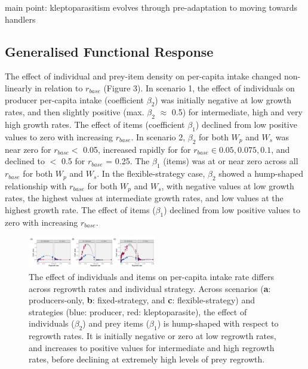 \documentclass[11pt]{article}
\begin{document}
main point: kleptoparasitism evolves through pre-adaptation to moving towards handlers

\subsection*{Generalised Functional Response}

The effect of individual and prey-item density on per-capita intake changed non-linearly in relation to $r_{base}$ (Figure 3).
In scenario 1, the effect of individuals on producer per-capita intake (coefficient $\beta_2$) was initially negative at low growth rates, and then slightly positive (max. $\beta_2$ $\approx$ 0.5) for intermediate, high and very high growth rates.
The effect of items (coefficient $\beta_1$) declined from low positive values to zero with increasing $r_{base}$.
In scenario 2, $\beta_2$ for both $W_p$ and $W_s$ was near zero for $r_{base} <$ 0.05, increased rapidly for for $r_{base} \in 0.05, 0.075, 0.1$, and declined to $<$ 0.5 for $r_{base}$ = 0.25.
The $\beta_1$ (items) was at or near zero across all $r_{base}$ for both $W_p$ and $W_s$.
In the flexible-strategy case, $\beta_2$ showed a hump-shaped relationship with $r_{base}$ for both $W_p$ and $W_s$, with negative values at low growth rates, the highest values at intermediate growth rates, and low values at the highest growth rate.
The effect of items ($\beta_1$) declined from low positive values to zero with increasing $r_{base}$.

\begin{figure}[h]
    \centering
    \includegraphics[width=0.50\textwidth]{figures/fig_05_coef_intake_general.png}
    \caption{
        The effect of individuals and items on per-capita intake rate differs across regrowth rates and individual strategy.
        Across scenarios (\textbf{a}: producers-only, \textbf{b}: fixed-strategy, and \textbf{c}: flexible-strategy) and strategies (blue: producer, red: kleptoparasite), the effect of individuals ($\beta_2$) and prey items ($\beta_1$) is hump-shaped with respect to regrowth rates.
        It is initially negative or zero at low regrowth rates, and increases to positive values for intermediate and high regrowth rates, before declining at extremely high levels of prey regrowth.
    }
\end{figure}
\end{document}
